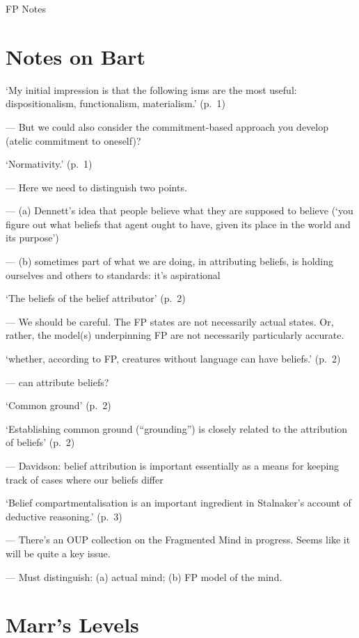 \documentclass[12pt,\papersize]{extarticle}
\begin{document}
\setlength\footnotesep{1em}



FP Notes

\section{Notes on Bart}
‘My initial impression is that the following isms are the most useful: dispositionalism, functionalism, materialism.’ (p.~1)

--- But we could also consider the commitment-based approach you develop (atelic commitment to oneself)?

‘Normativity.’ (p.~1)

--- Here we need to distinguish two points.

--- (a) Dennett’s idea that people believe what they are supposed to believe (‘you figure out what beliefs that agent ought to have, given its place in the world and its purpose’)

--- (b) sometimes part of what we are doing, in attributing beliefs, is holding ourselves and others to standards: it’s aspirational

‘The beliefs of the belief attributor’ (p.~2)

--- We should be careful. The FP states are not necessarily actual states. Or, rather, the model(s) underpinning FP are not necessarily particularly accurate.

‘whether, according to FP, creatures without language can have beliefs.’ (p.~2)

--- can attribute beliefs?

‘Common ground’ (p.~2)

‘Establishing common ground (“grounding”) is closely related to the attribution of beliefs’ (p.~2)

--- Davidson: belief attribution is important essentially as a means for keeping track of cases where our beliefs differ

‘Belief compartmentalisation is an important ingredient in Stalnaker’s account of deductive reasoning.’ (p.~3)

--- There’s an OUP collection on the Fragmented Mind in progress. Seems like it will be quite a key issue.

--- Must distinguish: (a) actual mind; (b) FP model of the mind.


\section{Marr’s Levels}
\end{document}
